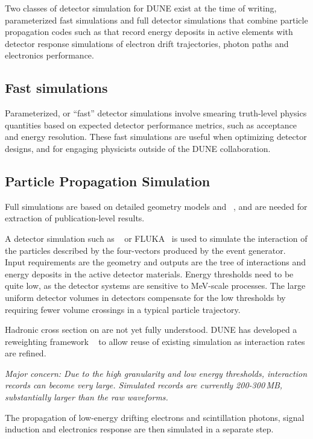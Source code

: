 \documentclass[../main-v1.tex]{subfiles}
\begin{document}
Two classes of detector simulation for DUNE exist at the time of writing, parameterized fast simulations and full detector simulations that combine particle propagation codes such as  that record energy deposits in active elements with detector response simulations of electron drift trajectories, photon paths and electronics performance. 

\subsection{Fast simulations}
Parameterized, or ``fast'' detector simulations involve smearing truth-level physics quantities based on expected detector performance metrics, such as acceptance and energy resolution.  These fast simulations are useful when optimizing detector designs, and for engaging physicists outside of the DUNE collaboration.  

\subsection{Particle Propagation Simulation}
Full simulations are based on detailed geometry models and ~\cite{Agostinelli:2002hh,Allison:2016lfl}, and are needed for extraction of publication-level results.

A detector simulation such as ~\cite{Allison:2016lfl} or FLUKA~\cite{Bohlen:2014buj} is used to simulate the interaction of the particles described by the four-vectors produced by the event generator. Input requirements are the geometry and outputs are the tree of interactions and energy deposits in the active detector materials. 
Energy thresholds need to be quite low, as the detector systems are sensitive to MeV-scale processes. The large uniform detector volumes in  detectors compensate for the low thresholds by requiring fewer volume crossings in a typical particle trajectory.  

Hadronic cross section on  are not yet fully understood.  DUNE has developed a reweighting framework 
~\cite{Calcutt:2021zck} to allow reuse of existing simulation as interaction rates are refined.

{\it Major concern: 
Due to the high granularity and low energy thresholds, interaction records can become very large. Simulated  records are currently 200-300\,MB, substantially larger than the raw waveforms.}

The propagation of low-energy drifting electrons and scintillation photons, signal induction  and electronics response are then simulated in a separate step.
\end{document}
